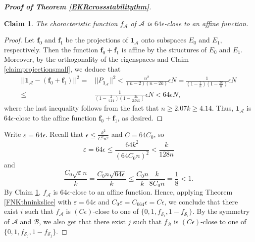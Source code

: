 \documentclass[11pt]{article}
\numberwithin{equation}{section}
\newtheorem{claim}[theorem]{Claim}
\def\A{\mathcal{A}}
\def\B{\mathcal{B}}
\def\S{\mathcal{S}}
\def\f{\mathbf{f}}
\def\1{\mathbf{1}}
\begin{document}
\begin{proof}[{\bf Proof of Theorem \ref{EKRcrossstabilitythm}}]
\begin{claim}\label{claimcloseaffine}
The characteristic function $f_\A$ of $\A$ is $64\epsilon$-close to an affine function.
\end{claim}
\begin{proof}
Let $\f_0$ and $\f_1$ be the projections of $\1_\A$ onto subspaces $E_0$ and
$E_1$, respectively.
Then the function $\f_0+\f_1$ is affine by the structures of $E_0$ and
$E_1$.
Moreover, by the orthogonality of the eigenspaces and Claim \ref{claimprojectionsmall},
we deduce that
\begin{align*}
||\1_\A-(\f_0+\f_1)||^2=&||P_{\1_\A}||^2
< \frac{n^2}{ (n-2 )(n-2k )}\epsilon N
=\frac{1}{ \left(1-\frac{2}{n} \right)\left(1-\frac{2k}{n}\right)}\epsilon N\\
\leq&\frac{1}{\left(1-\frac{2}{4.14} \right) \left(1-\frac{2k}{2.07k}\right)}\epsilon N
<64\epsilon N ,
\end{align*}
%
where the last inequality follows from the fact that $n\geq 2.07k\geq 4.14.$
Thus, $\1_\A$ is $64\epsilon$-close to the affine function $\f_0+\f_1$,
as desired.
\end{proof}


Write $\varepsilon=64\epsilon$. %
Recall that $\epsilon\leq \frac{k^2}{C^2n^2}$ and $C=64C_0$, so
$$\varepsilon=64\epsilon \leq \frac{64k^2}{(64C_0 n)^2}  < \frac{k}{128n}$$
and
$$\frac{C_0 \sqrt{\varepsilon}n}{k}=
\frac{C_0n\sqrt{64\epsilon}}{k}
\leq\frac{C_0n }{k}\frac{k }{8C_0n}=\frac18<1.$$
By Claim \ref{claimcloseaffine}, $f_\A$ is $64\epsilon$-close to an affine function.
Hence, applying Theorem \ref{FNKthninkslice} with $\varepsilon=64\epsilon$ and
$C_0\varepsilon=C_064\epsilon=C\epsilon$,
we conclude that there exist $i$
such that $f_\A$ is $(C\epsilon)$-close to one of $\{0,1, f_{\S_i},1-f_{\S_i}\}$.
By the symmetry of $\A$ and $\B$, we also get that there exist $j$ such that $f_\B$ is $(C\epsilon)$-close to one of $\{0,1, f_{\S_j},1-f_{\S_j}\}$.


\end{proof}
\end{document}
